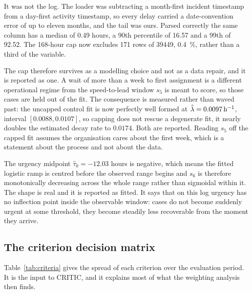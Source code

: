It was not the log. The loader was subtracting a month-first incident timestamp from a
day-first activity timestamp, so every delay carried a date-convention error of up to eleven
months, and the tail was ours. Parsed correctly the same column has a median of \num{0.49} hours, a
90th percentile of \num{16.57} and a 99th of \num{92.52}. The \num{168}-hour cap now excludes
\num{171} rows of \num{39449}, \SI{0.4}{\percent}, rather than a third of the variable.

The cap therefore survives as a modelling choice and not as a data repair, and it is reported
as one. A wait of more than a week to first assignment is a different operational regime from
the speed-to-lead window $s_5$ is meant to score, so those cases are held out of the fit. The
consequence is measured rather than waved past: the uncapped control fit is now perfectly
well formed at $\hat{\lambda} = \num{0.0097}\,{\rm h}^{-1}$,
interval $[\num{0.0088}, \num{0.0107}]$, so capping
does not rescue a degenerate fit, it nearly doubles the estimated decay rate to
$\num{0.0174}$. Both are reported. Reading $s_5$ off the capped fit assumes the
organisation cares about the first week, which is a statement about the process and not about
the data.

The urgency midpoint $\hat{\tau}_0 = \num{-12.03}$ hours is negative, which means the fitted
logistic ramp is centred before the observed range begins and $s_6$ is therefore monotonically
decreasing across the whole range rather than sigmoidal within it. The shape is real and it is
reported as fitted. It says that on this log urgency has no inflection point inside the
observable window: cases do not become suddenly urgent at some threshold, they become steadily
less recoverable from the moment they arrive.

\subsection{The criterion decision matrix}
\label{sec:decision-matrix}

Table~\ref{tab:criteria} gives the spread of each criterion over the evaluation period. It is
the input to CRITIC, and it explains most of what the weighting analysis then finds.

\begin{table}[htbp]
\centering
\caption{Criterion statistics over the evaluation-period decision matrix. Conflict is the CRITIC
term $\sum_\ell (1-\rho_{k\ell})$. Exact zeros matter because they are what force the floor in
Equation~\ref{eq:powermean}.}
\label{tab:criteria}
\small


\end{table}

